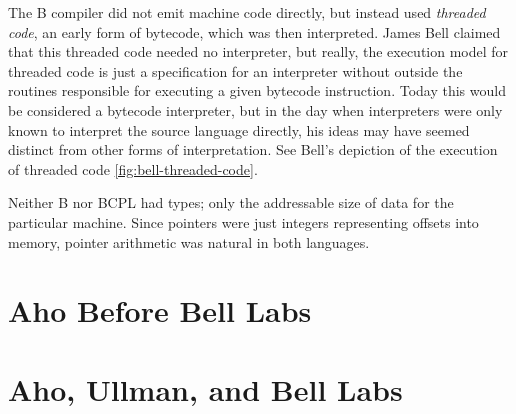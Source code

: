 The B compiler did not emit machine code directly, but instead used
\textit{threaded code}\cite{bell_threaded_code_1973}, an early form of \gls{bytecode},
which was then interpreted.
James Bell claimed that this threaded code needed no interpreter,
but really, the execution model for threaded code is just a specification
for an interpreter without outside the routines responsible for executing a given
bytecode instruction.
Today this would be considered a bytecode interpreter, but in the day when interpreters
were only known to interpret the source language directly, his ideas may have seemed
distinct from other forms of interpretation.
See Bell's depiction of the execution of threaded code \ref{fig:bell-threaded-code}.

Neither B nor BCPL had types; only the addressable size of data for the particular machine.
Since pointers were just integers representing offsets into memory, pointer arithmetic
was natural in both languages.

\section{Aho Before Bell Labs}

\section{Aho, Ullman, and Bell Labs}

